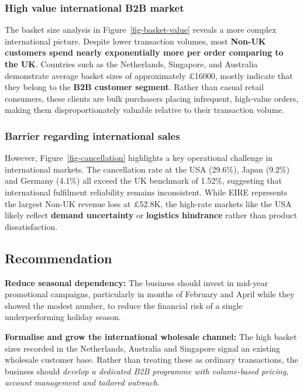\documentclass[
  letterpaper,
  DIV=11,
  numbers=noendperiod]{scrartcl}
\begin{document}
\subsubsection{High value international B2B
market}\label{high-value-international-b2b-market}

The basket size analysis in Figure~\ref{fig-basket-value} reveals a more
complex international picture. Despite lower transaction volumes, most
\textbf{Non-UK customers spend nearly exponentially more per order
comparing to the UK}. Countries such as the Netherlands, Singapore, and
Australia demonstrate average basket sizes of approximately £16000,
mostly indicate that they belong to the \textbf{B2B customer segment}.
Rather than casual retail consumers, these clients are bulk purchasers
placing infrequent, high-value orders, making them disproportionately
valuable relative to their transaction volume.

\subsubsection{Barrier regarding international
sales}\label{barrier-regarding-international-sales}

However, Figure~\ref{fig-cancellation} highlights a key operational
challenge in international markets. The cancellation rate at the USA
(29.6\%), Japan (9.2\%) and Germany (4.1\%) all exceed the UK benchmark
of 1.52\%, suggesting that international fulfilment reliability remains
inconsistent. While EIRE represents the largest Non-UK revenue loss at
£52.8K, the high-rate markets like the USA likely reflect \textbf{demand
uncertainty} or \textbf{logistics hindrance} rather than product
dissatisfaction.

\subsection{Recommendation}\label{recommendation}

\textbf{Reduce seasonal dependency:} The business should invest in
mid-year promotional campaigns, particularly in months of February and
April while they showed the modest number, to reduce the financial risk
of a single underperforming holiday season.

\textbf{Formalise and grow the international wholesale channel:} The
high basket sizes recorded in the Netherlands, Australia and Singapore
signal an existing wholesale customer base. Rather than treating these
as ordinary transactions, the business should \emph{develop a dedicated
B2B programme with volume-based pricing, account management and tailored
outreach}.
\end{document}
